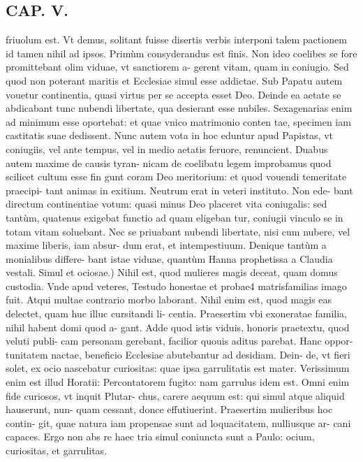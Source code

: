 \documentclass{article}
\begin{document}
\begin{pages}
\section*{CAP. V. }
\marginpar{[ p.63 ]}\pstart friuolum est. Vt demus, solitant fuisse disertis verbis interponi talem pactionem id tamen nihil ad ipsos. Primùm consyderandus est finis. Non ideo coelibes se fore promittebant olim viduae, vt sanctiorem a- gerent vitam, quam in coniugio. Sed quod non poterant maritis et Ecclesiae simul esse addictae. Sub Papatu autem vouetur continentia, quasi virtus per se accepta esset Deo. Deinde ea aetate se abdicabant tunc nubendi libertate, qua desierant esse nubiles. Sexagenarias enim ad minimum esse oportebat: et quae vnico matrimonio conten tae, specimen iam castitatis suae dedissent. Nunc autem vota in hoc eduntur apud Papistas, vt coniugiis, vel ante tempus, vel in medio aetatis feruore, renuncient. Duabus autem maxime de causis tyran- nicam de coelibatu legem improbamus quod scilicet cultum esse fin gunt coram Deo meritorium: et quod vouendi temeritate praecipi- tant animas in exitium. Neutrum erat in veteri instituto. Non ede- bant directum continentiae votum: quasi minus Deo placeret vita coniugalis: sed tantùm, quatenus exigebat functio ad quam eligeban tur, coniugii vinculo se in totam vitam soluebant. Nec se priuabant nubendi libertate, nisi cum nubere, vel maxime liberis, iam absur- dum erat, et intempestiuum. Denique tantùm a monialibus differe- bant istae viduae, quantùm Hanna prophetissa a Claudia vestali.  \pend\pstart Simul et ociosae.) Nihil est, quod mulieres magis deceat, quam domus custodia. Vnde apud veteres, Testudo honestae et probae4 matrisfamilias imago fuit. Atqui multae contrario morbo laborant. Nihil enim est, quod magis eas delectet, quam huc illuc cursitandi li- centia. Praesertim vbi exoneratae familia, nihil habent domi quod a- gant. Adde quod istis viduis, honoris praetextu, quod veluti publi- cam personam gerebant, facilior quouis aditus parebat. Hanc oppor- tunitatem nactae, beneficio Ecclesiae abutebantur ad desidiam. Dein- de, vt fieri solet, ex ocio nascebatur curiositas: quae ipsa garrulitatis est mater. Verissimum enim est illud Horatii: Percontatorem fugito: nam garrulus idem est. Omni enim fide curiosos, vt inquit Plutar- chus, carere aequum est: qui simul atque aliquid hauserunt, nun- quam cessant, donce effutiuerint. Praesertim mulieribus hoc contin- git, quae natura iam propensae sunt ad loquacitatem, nulliusque ar- cani capaces. Ergo non abs re haec tria simul coniuncta sunt a Paulo: ocium, curiositas, et garrulitas.  \pend
{}
{}

\end{pages}
\end{document}
